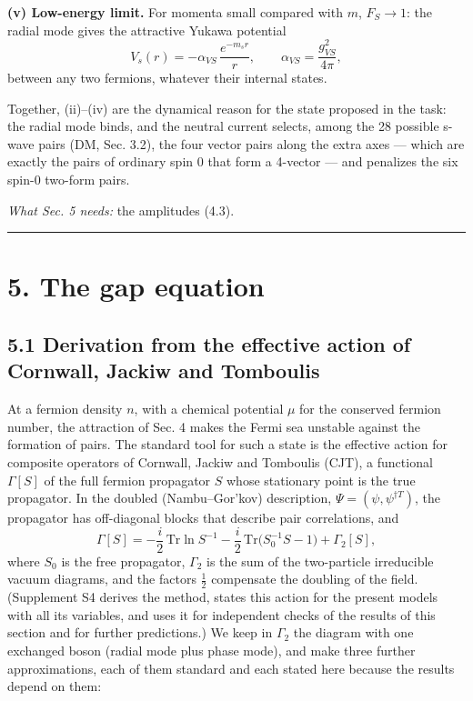 \documentclass[
  10pt,
]{article}
\begin{document}
\textbf{(v) Low-energy limit.} For momenta small compared with \(m\),
\(F_S\to1\): the radial mode gives the attractive Yukawa potential
\[V_s(r)=-\alpha_{VS}\,\frac{e^{-m_sr}}{r},\qquad\alpha_{VS}=\frac{g_{VS}^2}{4\pi},\tag{4.6}\]
between any two fermions, whatever their internal states.

Together, (ii)--(iv) are the dynamical reason for the state proposed in
the task: the radial mode binds, and the neutral current selects, among
the 28 possible s-wave pairs (DM, Sec. 3.2), the four vector pairs along
the extra axes --- which are exactly the pairs of ordinary spin 0 that
form a 4-vector --- and penalizes the six spin-0 two-form pairs.

\emph{What Sec. 5 needs:} the amplitudes (4.3).

\begin{center}\rule{0.5\linewidth}{0.5pt}\end{center}

\hypertarget{the-gap-equation}{%
\section{5. The gap equation}\label{the-gap-equation}}

\hypertarget{derivation-from-the-effective-action-of-cornwall-jackiw-and-tomboulis}{%
\subsection{5.1 Derivation from the effective action of Cornwall, Jackiw
and
Tomboulis}\label{derivation-from-the-effective-action-of-cornwall-jackiw-and-tomboulis}}

At a fermion density \(n\), with a chemical potential \(\mu\) for the
conserved fermion number, the attraction of Sec. 4 makes the Fermi sea
unstable against the formation of pairs. The standard tool for such a
state is the effective action for composite operators of Cornwall,
Jackiw and Tomboulis (CJT), a functional \(\Gamma[S]\) of the full
fermion propagator \(S\) whose stationary point is the true propagator.
In the doubled (Nambu--Gor'kov) description,
\(\Psi=(\psi,\psi^{\dagger T})\), the propagator has off-diagonal blocks
that describe pair correlations, and
\[\Gamma[S]=-\frac i2\,\mathrm{Tr}\ln S^{-1}-\frac i2\,\mathrm{Tr}\big(S_0^{-1}S-1\big)+\Gamma_2[S],\tag{5.1}\]
where \(S_0\) is the free propagator, \(\Gamma_2\) is the sum of the
two-particle irreducible vacuum diagrams, and the factors \(\tfrac12\)
compensate the doubling of the field. (Supplement S4 derives the method,
states this action for the present models with all its variables, and
uses it for independent checks of the results of this section and for
further predictions.) We keep in \(\Gamma_2\) the diagram with one
exchanged boson (radial mode plus phase mode), and make three further
approximations, each of them standard and each stated here because the
results depend on them:
\end{document}
